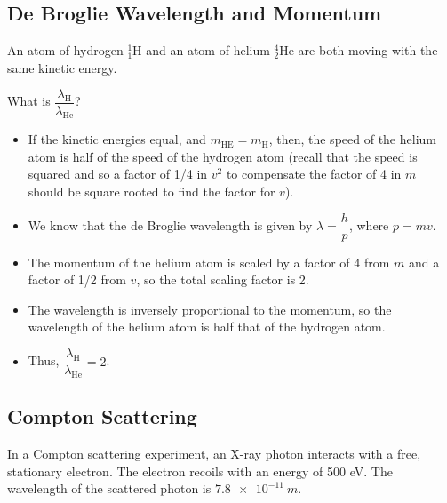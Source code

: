 \documentclass[a4paper,12pt]{article}
\newcommand{\atom}[3]{{}^{#1}_{#2}\text{#3}}
\begin{document}
\pagebreak

\subsection{De Broglie Wavelength and Momentum}

An atom of hydrogen $\atom{1}{1}{H}$ and an atom of helium $\atom{4}{2}{He}$ are both moving with the same kinetic energy.

What is $\dfrac{\lambda_\text{H}}{\lambda_\text{He}}$?

\begin{itemize}
  \item If the kinetic energies equal, and $m_{\text{HE}} = m_{\text{H}}$, then, the speed of the helium atom is half of the speed of the hydrogen atom (recall that the speed is squared and so a factor of 1/4 in $v^2$ to compensate the factor of 4 in $m$ should be square rooted to find the factor for $v$).
  \item We know that the de Broglie wavelength is given by $\lambda = \dfrac{h}{p}$, where $p = mv$.
  \item The momentum of the helium atom is scaled by a factor of 4 from $m$ and a factor of 1/2 from $v$, so the total scaling factor is 2.
  \item The wavelength is inversely proportional to the momentum, so the wavelength of the helium atom is half that of the hydrogen atom.
  \item Thus, $\dfrac{\lambda_\text{H}}{\lambda_\text{He}} = 2$.
\end{itemize}

\pagebreak

\subsection{Compton Scattering}

In a Compton scattering experiment, an X-ray photon interacts with a free, stationary electron. The electron recoils with an energy of 500 eV. The wavelength of the scattered photon is $\SI{7.8e-11}{m}$.
\end{document}
